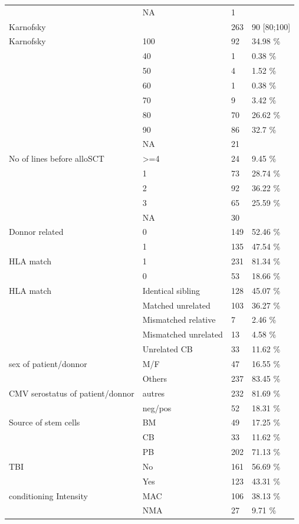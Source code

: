 \documentclass[a4paper,11pt] {article}
\begin{document}
\begin{longtable}{llll}
   & NA & 1 &  \\ 
  Karnofsky &  & 263 & 90 [80;100] \\ 
  Karnofsky & 100 & 92 & 34.98 \% \\ 
   & 40 & 1 & 0.38 \% \\ 
   & 50 & 4 & 1.52 \% \\ 
   & 60 & 1 & 0.38 \% \\ 
   & 70 & 9 & 3.42 \% \\ 
   & 80 & 70 & 26.62 \% \\ 
   & 90 & 86 & 32.7 \% \\ 
   & NA & 21 &  \\ 
  No of lines before alloSCT & >=4 & 24 & 9.45 \% \\ 
   & 1 & 73 & 28.74 \% \\ 
   & 2 & 92 & 36.22 \% \\ 
   & 3 & 65 & 25.59 \% \\ 
   & NA & 30 &  \\ 
  Donnor related & 0 & 149 & 52.46 \% \\ 
   & 1 & 135 & 47.54 \% \\ 
  HLA match & 1 & 231 & 81.34 \% \\ 
   & 0 & 53 & 18.66 \% \\ 
  HLA match & Identical sibling & 128 & 45.07 \% \\ 
   & Matched unrelated & 103 & 36.27 \% \\ 
   & Mismatched relative & 7 & 2.46 \% \\ 
   & Mismatched unrelated & 13 & 4.58 \% \\ 
   & Unrelated CB & 33 & 11.62 \% \\ 
  sex of patient/donnor & M/F & 47 & 16.55 \% \\ 
   & Others & 237 & 83.45 \% \\ 
  CMV serostatus of patient/donnor & autres & 232 & 81.69 \% \\ 
   & neg/pos & 52 & 18.31 \% \\ 
  Source of stem cells & BM & 49 & 17.25 \% \\ 
   & CB & 33 & 11.62 \% \\ 
   & PB & 202 & 71.13 \% \\ 
  TBI & No & 161 & 56.69 \% \\ 
   & Yes & 123 & 43.31 \% \\ 
  conditioning Intensity & MAC & 106 & 38.13 \% \\ 
   & NMA & 27 & 9.71 \% \\ 

\end{longtable}
\end{document}
